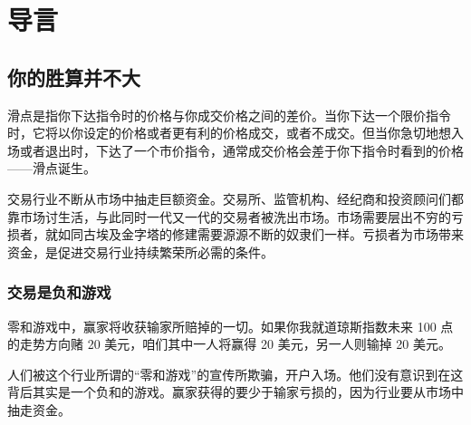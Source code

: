 \chapter{导言}
\section*{你的胜算并不大}
滑点是指你下达指令时的价格与你成交价格之间的差价。当你下达一个限价指令时，它将以你设定的价格或者更有利的价格成交，或者不成交。但当你急切地想入场或者退出时，下达了一个市价指令，通常成交价格会差于你下指令时看到的价格——滑点诞生。

交易行业不断从市场中抽走巨额资金。交易所、监管机构、经纪商和投资顾问们都靠市场讨生活，与此同时一代又一代的交易者被洗出市场。市场需要层出不穷的亏损者，就如同古埃及金字塔的修建需要源源不断的奴隶们一样。亏损者为市场带来资金，是促进交易行业持续繁荣所必需的条件。
\subsection*{交易是负和游戏}
零和游戏中，赢家将收获输家所赔掉的一切。如果你我就道琼斯指数未来 100 点的走势方向赌 20 美元，咱们其中一人将赢得 20 美元，另一人则输掉 20 美元。

人们被这个行业所谓的“零和游戏”的宣传所欺骗，开户入场。他们没有意识到在这背后其实是一个负和的游戏。赢家获得的要少于输家亏损的，因为行业要从市场中抽走资金。